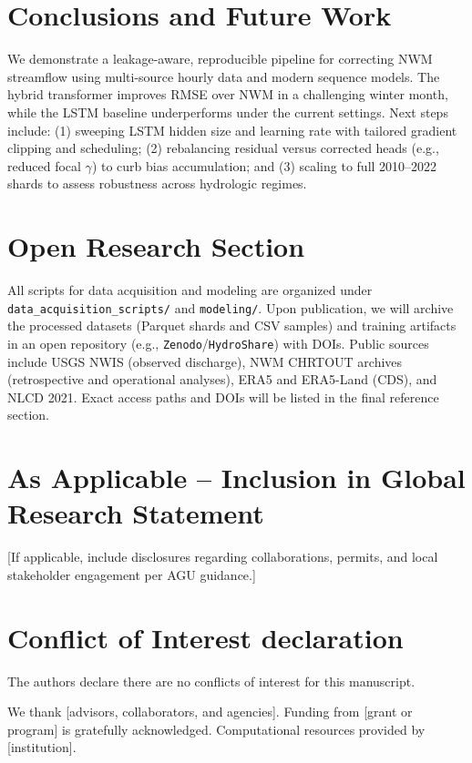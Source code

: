 \documentclass[draft]{agujournal2019}
\begin{document}
\section{Conclusions and Future Work}
We demonstrate a leakage-aware, reproducible pipeline for correcting NWM streamflow using multi-source hourly data and modern sequence models. The hybrid transformer improves RMSE over NWM in a challenging winter month, while the LSTM baseline underperforms under the current settings. Next steps include: (1) sweeping LSTM hidden size and learning rate with tailored gradient clipping and scheduling; (2) rebalancing residual versus corrected heads (e.g., reduced focal $\gamma$) to curb bias accumulation; and (3) scaling to full 2010--2022 shards to assess robustness across hydrologic regimes.

\section*{Open Research Section}
All scripts for data acquisition and modeling are organized under \texttt{data\_acquisition\_scripts/} and \texttt{modeling/}. Upon publication, we will archive the processed datasets (Parquet shards and CSV samples) and training artifacts in an open repository (e.g., \texttt{Zenodo}/\texttt{HydroShare}) with DOIs. Public sources include USGS NWIS (observed discharge), NWM CHRTOUT archives (retrospective and operational analyses), ERA5 and ERA5-Land (CDS), and NLCD 2021. Exact access paths and DOIs will be listed in the final reference section.

\section*{As Applicable -- Inclusion in Global Research Statement}
[If applicable, include disclosures regarding collaborations, permits, and local stakeholder engagement per AGU guidance.]

\section*{Conflict of Interest declaration}
The authors declare there are no conflicts of interest for this manuscript.

\acknowledgments
We thank [advisors, collaborators, and agencies]. Funding from [grant or program] is gratefully acknowledged. Computational resources provided by [institution].

% 
\end{document}
